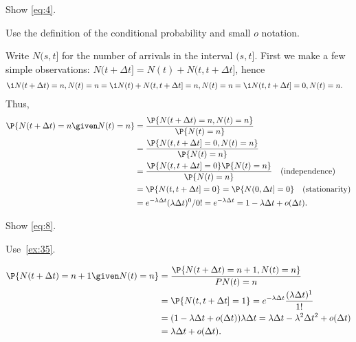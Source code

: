 \begin{exercise} \label{ex:35}
 Show \cref{eq:4}.
\begin{hint}
Use the definition of the conditional probability and small $o$ notation.

\end{hint}
\begin{solution}
Write $N(s, t]$ for the number of arrivals in the interval $(s,t]$. First we make a few simple observations: $N(t+\Delta t]= N(t) + N(t, t+\Delta t]$, hence
\begin{align*}
 \1{N(t+\Delta t)=n, N(t)=n}
&= \1{N(t) + N(t, t+\Delta t] = n, N(t)=n} = \1{N(t, t+\Delta t] = 0, N(t)=n}.
\end{align*}
Thus,
 \begin{align*}
 \P{N(t+\Delta t) = n \given N(t) = n}
&= \frac{\P{N(t+\Delta t) = n, N(t) = n}}{\P{N(t)=n}} \\
&= \frac{\P{N(t, t+\Delta t] = 0, N(t) = n}}{\P{N(t)=n}} \\
&= \frac{\P{N(t, t+\Delta t] = 0} \P{N(t) = n}}{\P{N(t)=n}} \quad \text{(independence)}\\
&= \P{N(t, t+\Delta t] = 0}
= \P{N(0, \Delta t] = 0} \quad\text{(stationarity)} \\
&= e^{-\lambda \Delta t} (\lambda \Delta t)^0/0!
= e^{-\lambda \Delta t} = 1-\lambda \Delta t + o(\Delta t).
 \end{align*}
\end{solution}
\end{exercise}



\begin{exercise} \label{ex:p-355}
 Show \cref{eq:8}.
\begin{hint} Use~\cref{ex:35}.
\end{hint}
\begin{solution}
 \begin{align*}
 \P{N(t+\Delta t) = n +1 \given N(t) = n}
&= \frac{\P{N(t+\Delta t) = n +1 , N(t) =n}}{P{N(t) = n}}\\
&= \P{N(t, t+\Delta t] = 1} = e^{-\lambda \Delta t} \frac{(\lambda \Delta t)^1}{1!} \\
&= (1-\lambda \Delta t + o(\Delta t))\lambda \Delta t = \lambda \Delta t - \lambda^2 \Delta t^2 + o(\Delta t) \\
&= \lambda \Delta t + o(\Delta t).
 \end{align*}
\end{solution}
\end{exercise}

